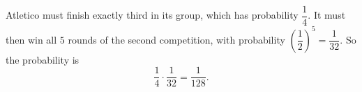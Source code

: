Atletico must finish exactly third in its group, which has probability $\dfrac{1}{4}$. It must then win all $5$ rounds of the second competition, with probability $\left(\dfrac{1}{2}\right)^5=\dfrac{1}{32}$. So the probability is
\[\dfrac{1}{4}\cdot\dfrac{1}{32}=\boxed{\dfrac{1}{128}}.\]
